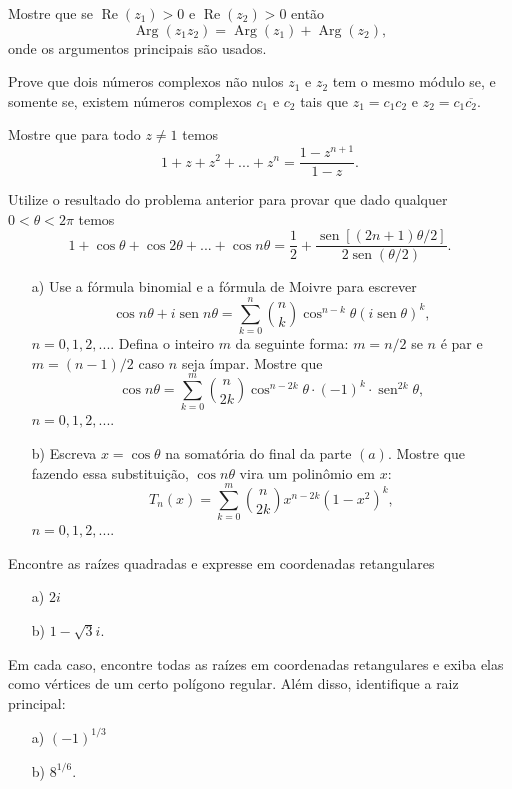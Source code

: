\problem
Mostre que se $\operatorname{Re}(z_1) >0 $ e $\operatorname{Re}(z_2) >0$ ent\~ao
\[\operatorname{Arg}(z_1z_2) = \operatorname{Arg}(z_1)+\operatorname{Arg}(z_2),\]
onde os argumentos principais s\~ao usados.

\problem
Prove que dois n\'umeros complexos n\~ao nulos $z_1$ e $z_2$ tem o mesmo m\'odulo se, e somente se, existem n\'umeros complexos $c_1$ e $c_2$ tais que $z_1 = c_1c_2$ e $z_2=c_1\overline{c_2}$.

\problem
Mostre que para todo $z \ne 1$ temos
\[1+z+z^2+...+z^n = \frac{1-z^{n+1}}{1-z}.\]

\problem
Utilize o resultado do problema anterior para provar que dado qualquer $0<\theta < 2\pi$ temos
\[1+\cos \theta + \cos 2\theta + ... + \cos n\theta = \frac{1}{2}+\frac{\operatorname{sen}[(2n+1)\theta/2]}{2\operatorname{sen}(\theta/2)}.\]

\problem 
\begin{itemize}
\item[a)] Use a f\'ormula binomial e a f\'ormula de Moivre para escrever
\[\cos n\theta +i\operatorname{sen} n\theta = \sum_{k=0}^{n}\binom{n}{k}\cos^{n-k}\theta(i \operatorname{sen}\theta)^k, \]
$n=0,1,2,...$.
Defina o inteiro $m$ da seguinte forma: $m=n/2$ se $n$ \'e par e $m=(n-1)/2$ caso $n$ seja \'impar. Mostre que
\[\cos n\theta = \sum_{k=0}^{m}\binom{n}{2k}\cos^{n-2k}\theta \cdot (-1)^k\cdot \operatorname{sen}^{2k}\theta,\]
$n=0,1,2,...$.

\item[b)] Escreva $x= \cos \theta$ na somat\'oria do final da parte $(a)$. Mostre que fazendo essa substitui\c c\~ao, $\cos n \theta$ vira um polin\^omio em $x$:
\[T_n(x) = \sum_{k=0}^{m}\binom{n}{2k}x^{n-2k}(1-x^2)^{k},\]
$n=0,1,2,...$. 
\end{itemize}



\problem
Encontre as ra\'izes quadradas e expresse em coordenadas retangulares
\begin{itemize}
\item[a)] $2i$
\item[b)] $1-\sqrt{3}i$.
\end{itemize}  


\problem
 Em cada caso, encontre todas as ra\'izes em coordenadas retangulares e exiba elas como v\'ertices de um certo pol\'igono regular. Al\'em disso, identifique a raiz principal:
\begin{itemize}
\item[a)]$(-1)^{1/3}$
\item[b)] $8^{1/6}$.
\end{itemize}  


